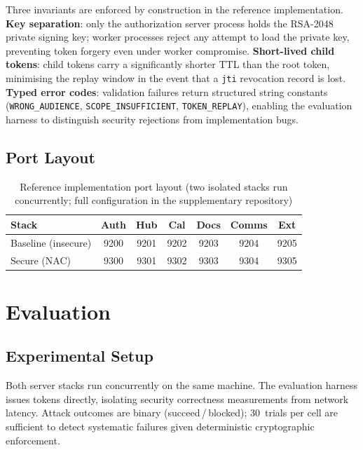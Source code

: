 \documentclass[journal]{IEEEtran}
\begin{document}
Three invariants are enforced by construction in the reference implementation.
\textbf{Key separation}: only the authorization server process holds the
RSA-2048 private signing key; worker processes reject any attempt to load the
private key, preventing token forgery even under worker compromise.
\textbf{Short-lived child tokens}: child tokens carry a significantly shorter
TTL than the root token, minimising the replay window in the event that a
\texttt{jti} revocation record is lost.
\textbf{Typed error codes}: validation failures return structured string
constants (\texttt{WRONG\_AUDIENCE}, \texttt{SCOPE\_INSUFFICIENT},
\texttt{TOKEN\_REPLAY}), enabling the evaluation harness to distinguish
security rejections from implementation bugs.

\subsection{Port Layout}

\begin{table}[h]
\caption{Reference implementation port layout (two isolated stacks
run concurrently; full configuration in the supplementary repository)}
\label{tab:ports}
\centering
\footnotesize
\begin{tabular}{lcccccc}
\toprule
\textbf{Stack} & \textbf{Auth} & \textbf{Hub} & \textbf{Cal}
               & \textbf{Docs} & \textbf{Comms} & \textbf{Ext} \\
\midrule
Baseline (insecure) & 9200 & 9201 & 9202 & 9203 & 9204 & 9205 \\
Secure (NAC)        & 9300 & 9301 & 9302 & 9303 & 9304 & 9305 \\
\bottomrule
\end{tabular}
\end{table}


\section{Evaluation}
\label{sec:eval}

\subsection{Experimental Setup}

Both server stacks run concurrently on the same machine. The evaluation harness
issues tokens directly, isolating security correctness measurements from network
latency. Attack outcomes are binary (succeed\,/\,blocked); 30~trials per cell
are sufficient to detect systematic failures given deterministic cryptographic
enforcement.
\end{document}
